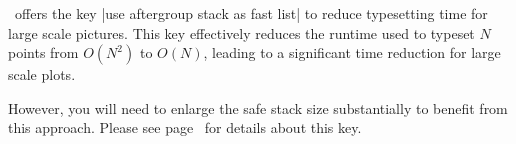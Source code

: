 \PGFPlots\ offers the key |use aftergroup stack as fast list| to reduce typesetting time for large scale pictures. This key effectively reduces the runtime used to typeset $N$ points from $O(N^2)$ to $O(N)$, leading to a significant time reduction for large scale plots.

However, you will need to enlarge the safe stack size substantially to benefit from this approach. Please see page~\pageref{page:aftergroupstack:as:list} for details about this key.
